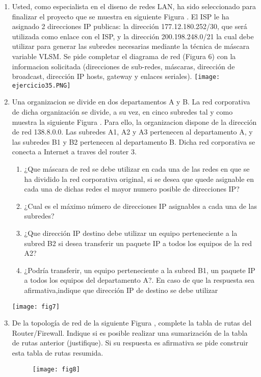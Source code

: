 \documentclass{udparticle}
\begin{document}
\begin{enumerate}
\item Usted, como especialista en el diseno de redes LAN, ha sido seleccionado para
finalizar el proyecto que se muestra en siguiente  Figura . El ISP le ha asignado 2 
direcciones IP publicas: la dirección 177.12.180.252/30, que será utilizada como 
enlace con el ISP, y la dirección 200.198.248.0/21 la cual debe utilizar para generar las subredes necesarias mediante la técnica de máscara variable VLSM.
Se pide completar el diagrama de red (Figura 6) con la informacion solicitada
(direcciones de sub-redes, máscaras, dirección de broadcast, dirección IP 
hosts, gateway y enlaces seriales).
\texttt{[image: ejercicio35.PNG]}
\item Una organizacion se divide en dos departamentos A y B. La red corporativa de 
dicha organización se divide, a su vez, en cinco subredes tal y como muestra la siguiente
Figura . Para ello, la organizacion dispone de la dirección de red 138.8.0.0. 
Las subredes A1, A2 y A3 pertenecen al departamento A, y las subredes B1 y B2 
pertenecen al departamento B. Dicha red corporativa se conecta a Internet    a traves 
del router 3.
\begin{enumerate}
\item ¿Que máscara de red se debe utilizar en cada una de las redes en que se ha dividido la red corporativa original, si se desea que quede asignable en 
cada una de dichas redes el mayor numero posible de direcciones IP?
\item¿Cual es el máximo número de direcciones IP asignables a cada una de las subredes?
\item ¿Que dirección IP destino debe utilizar un equipo perteneciente a la 
subred B2 si desea transferir un paquete IP a todos los equipos de la red 
A2?
\item ¿Podría transferir, un equipo perteneciente a la subred B1, un paquete 
IP a todos los equipos del departamento A?. En caso de que la respuesta sea afirmativa,indique que dirección IP de destino se debe utilizar\\
\end{enumerate}
\texttt{[image: fig7]}
\item De la topología de red de la siguiente Figura , complete la tabla de rutas del 
Router/Firewall. Indique si es posible realizar una sumarización de la tabla 
de rutas anterior (justifique). Si su respuesta es afirmativa se pide
construir esta tabla de rutas resumida.
	\begin{figure}[H]
	\centering
	\texttt{[image: fig8]}

\end{figure}
\end{enumerate}
\end{document}
